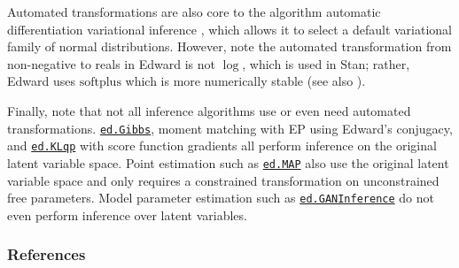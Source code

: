 Automated transformations are also core to the algorithm automatic
differentiation variational inference \citep{kucukelbir2017automatic},
which allows it to select a default variational family of normal
distributions. However, note the automated transformation from
non-negative to reals in Edward is not $\log$, which is used in Stan;
rather, Edward uses $\textrm{softplus}$ which is more numerically
stable (see also \citet[Fig.~9]{kucukelbir2017automatic}).

Finally, note that not all inference algorithms use or even need
automated transformations.
\href{/api/ed/Gibbs}{\texttt{ed.Gibbs}}, moment
matching with EP using Edward's conjugacy, and
\href{/api/ed/KLqp}{\texttt{ed.KLqp}}
with
score function gradients all perform inference on the original latent
variable space.
Point estimation such as \href{/api/ed/MAP}{\texttt{ed.MAP}} also
use the original latent variable space and only requires a
constrained transformation on unconstrained free parameters.
Model parameter estimation such as
\href{/api/ed/GANInference}{\texttt{ed.GANInference}} do not even
perform inference over latent variables.

\subsubsection{References}\label{references}
